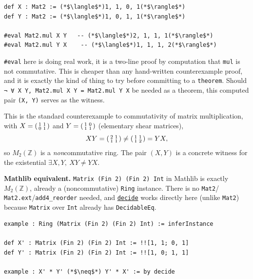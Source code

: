 \begin{lstlisting}
def X : Mat2 := (*$\langle$*)1, 1, 0, 1(*$\rangle$*)
def Y : Mat2 := (*$\langle$*)1, 0, 1, 1(*$\rangle$*)

#eval Mat2.mul X Y   -- (*$\langle$*)2, 1, 1, 1(*$\rangle$*)
#eval Mat2.mul Y X    -- (*$\langle$*)1, 1, 1, 2(*$\rangle$*)
\end{lstlisting}

\texttt{\#eval} here is doing real work, it is a two-line proof by computation that \texttt{mul} is not commutative. This is cheaper than any hand-written counterexample proof, and it is exactly the kind of thing to try before committing to a \texttt{theorem}. Should \texttt{¬ ∀ X Y, Mat2.mul X Y = Mat2.mul Y X} be needed as a theorem, this computed pair \texttt{(X, Y)} serves as the witness.

\begin{mathreading}

This is the standard counterexample to commutativity of matrix multiplication, with \(X =
\begin{psmallmatrix}1&1\\0&1\end{psmallmatrix}\) and \(Y =
\begin{psmallmatrix}1&0\\1&1\end{psmallmatrix}\) (elementary shear matrices), \[
XY = \begin{psmallmatrix}2&1\\1&1\end{psmallmatrix} \neq
\begin{psmallmatrix}1&1\\1&2\end{psmallmatrix} = YX,
\] so \(M_2(\mathbb{Z})\) is a \emph{non}commutative ring. The pair \((X, Y)\) is a concrete witness for the existential \(\exists X, Y,\ XY \neq YX\).

\end{mathreading}

\textbf{Mathlib equivalent.} \texttt{Matrix (Fin 2) (Fin 2) Int} in Mathlib is exactly \(M_2(\mathbb{Z})\), already a (noncommutative) \texttt{Ring} instance. There is no \texttt{Mat2}/ \texttt{Mat2.ext}/\texttt{add4\_\allowbreak{}reorder} needed, and \href{https://lean-lang.org/doc/reference/latest/Tactic-Proofs/Tactic-Reference/}{\texttt{decide}} works directly here (unlike \texttt{Mat2}) because \texttt{Matrix} over \texttt{Int} already has \texttt{DecidableEq}.

\begin{lstlisting}
example : Ring (Matrix (Fin 2) (Fin 2) Int) := inferInstance

def X' : Matrix (Fin 2) (Fin 2) Int := !![1, 1; 0, 1]
def Y' : Matrix (Fin 2) (Fin 2) Int := !![1, 0; 1, 1]

example : X' * Y' (*$\neq$*) Y' * X' := by decide
\end{lstlisting}

